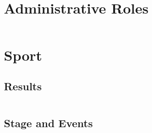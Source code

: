 \documentclass[
    a4paper,
    oneside,
    10pt
]{article}
\newenvironment{timeline}{%
	\begin{longtable}{ c | c }%
}{%
	\end{longtable}%
}
\begin{document}
    \section{Administrative Roles}
    \begin{timeline}
    		
    \end{timeline}
    
    \section{Sport}
    	\subsection{Results}
    	\begin{timeline}
    		
    \end{timeline}
    
    \subsection{Stage and Events}
    	\begin{timeline}
    		
    \end{timeline}
    
    \pagebreak
    \tableofcontents
\end{document}
